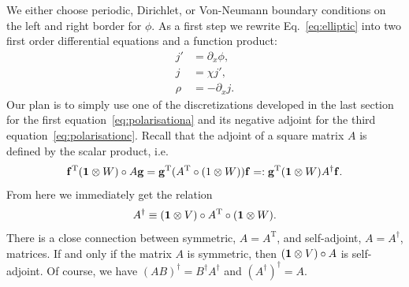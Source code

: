 We either choose periodic, Dirichlet, or Von-Neumann boundary conditions on the 
left and right border for $\phi$. 
As a first step we rewrite Eq.~\eqref{eq:elliptic} into two first order differential equations and a function product:
\begin{subequations}
\begin{align}
    j'&= \partial_x \phi, \label{eq:polarisationa}\\
    j &= \chi j', \label{eq:polarisationb}\\
    \rho &= -\partial_x j. \label{eq:polarisationc}
\end{align}
\end{subequations}
Our plan is to simply use one of the discretizations developed in the last 
section for the first equation~\eqref{eq:polarisationa} 
and its negative adjoint for the third equation~\eqref{eq:polarisationc}. 
Recall that the adjoint of a square matrix $A$ is defined by the scalar product, i.e. 
\begin{align}
    {\mathbf{f}}^\mathrm{T} (\mathbf{1}\otimes W)\circ A{\mathbf{g}} = 
    {\mathbf{g}}^\mathrm{T} (A^\mathrm{T}\circ(1\otimes W)) {\mathbf{f}} =:     {\mathbf{g}}^\mathrm{T} (\mathbf{1}\otimes W) A^\dagger {\mathbf{f}}. \nonumber
    \label{}
\end{align}
From here we immediately get the relation
\begin{align}
    A^\dagger \equiv (\mathbf{1}\otimes V)\circ A^\mathrm{T}\circ (\mathbf{1}\otimes W).
    \label{eq:adjoint}
\end{align}
There is a close connection between symmetric, $A=A^\mathrm{T}$, and self-adjoint, $A=A^\dagger$, matrices.
If and only if the matrix $A$ is symmetric, then $(\mathbf{1}\otimes V)\circ A$ is self-adjoint. Of course, we have $(AB)^\dagger = B^\dagger A^\dagger$ and $(A^\dagger)^\dagger = A$. 

